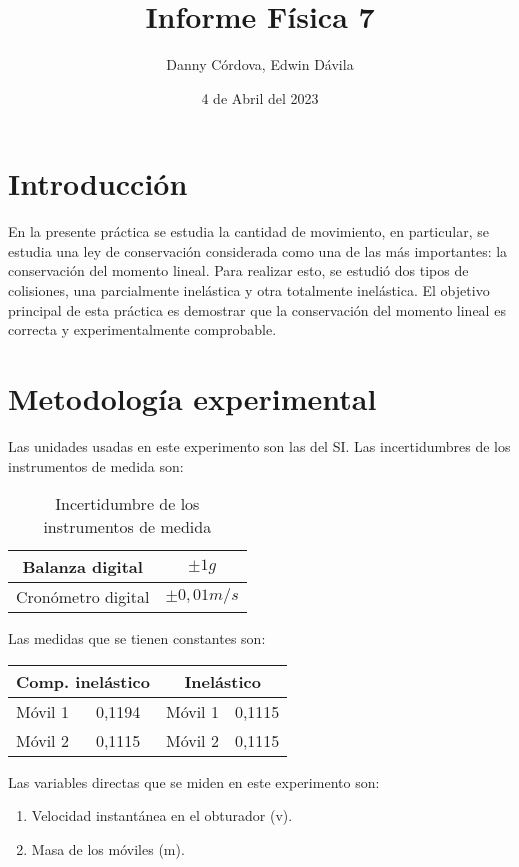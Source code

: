 \documentclass[a4paper]{article}
\title{Informe Física 7}
\author{Danny Córdova, Edwin Dávila}
\date{4 de Abril del 2023}
\begin{document}
\maketitle

\section{Introducción}
En la presente práctica se estudia la cantidad de movimiento, en particular, se estudia una ley de conservación considerada como una de las más importantes: la conservación del momento lineal. Para realizar esto, se estudió dos tipos de colisiones, una parcialmente inelástica y otra totalmente inelástica. El objetivo principal de esta práctica es demostrar que la conservación del momento lineal es correcta y experimentalmente comprobable. 

\section{Metodología experimental}

Las unidades usadas en este experimento son las del SI. Las incertidumbres de los instrumentos de medida son:

\begin{table}[H]
    \centering
    \begin{tabular}{|c|c|}
    \hline
        Balanza digital & $\pm1 g$ \\ \hline
        Cronómetro digital  & $\pm 0,01 m/s$ \\ \hline
    \end{tabular}
    \caption{Incertidumbre de los instrumentos de medida}
    \label{Incertidumbre de los instrumentos de medida}
\end{table}

Las medidas que se tienen constantes son: 
\begin{table}[H]
\centering
\begin{tabular}{|ll|ll|}
\hline
\multicolumn{2}{|c|}{Comp. inelástico} & \multicolumn{2}{c|}{Inelástico}       \\ \hline
\multicolumn{1}{|l|}{Móvil 1} & 0,1194 & \multicolumn{1}{l|}{Móvil 1} & 0,1115 \\ \hline
\multicolumn{1}{|l|}{Móvil 2} & 0,1115 & \multicolumn{1}{l|}{Móvil 2} & 0,1115 \\ \hline
\end{tabular}
\end{table}

Las variables directas que se miden en este experimento son:
\begin{enumerate}
  \item Velocidad instantánea en el obturador (v).
  \item Masa de los móviles (m).
\end{enumerate}
\end{document}
